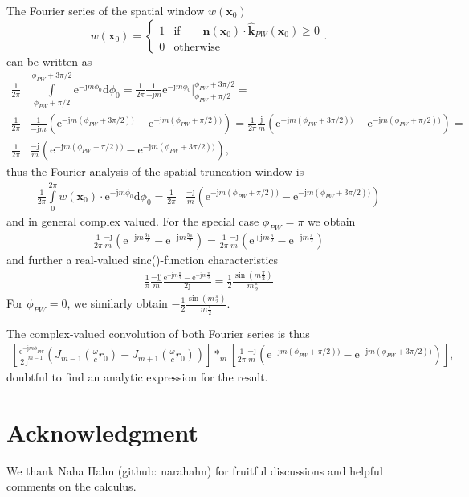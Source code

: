 \documentclass[a4paper,BCOR=15mm,10pt,twoside]{scrartcl}
\newcommand\e{\mathrm{e}}  %
\newcommand\im{\mathrm{j}}  %
\newcommand\fsd{\mathrm{d}}  %
\renewcommand{\vec}[1]{\mathbf{#1}}  %
\newcommand\unitn{\vec{n}}  %
\begin{document}
The Fourier series of the spatial window $w(\vec{x}_0)$
\begin{equation}
w(\vec{x}_0) =
    \begin{cases}
      1 & \text{if}\qquad
       \unitn(\vec{x}_0) \cdot \hat{\vec{k}}_{PW}(\vec{x}_0) \geq 0 \\
      0 & \text{otherwise}
    \end{cases}.
\end{equation}
can be written as
\begin{align}
\frac{1}{2 \pi}& \int\limits_{\phi_{PW}+\pi/2}^{\phi_{PW}+3\pi/2} \e^{- \im m \phi_0 } \fsd \phi_0 =
\frac{1}{2 \pi} \frac{1}{-\im m} \e^{- \im m \phi_0 }\bigg|_{\phi_{PW}+\pi/2}^{\phi_{PW}+3\pi/2} =\\
\frac{1}{2 \pi}& \frac{1}{-\im m} (\e^{- \im m (\phi_{PW}+3\pi/2)) } - \e^{- \im m (\phi_{PW}+\pi/2))})=
\frac{1}{2 \pi} \frac{\im}{m} (\e^{- \im m (\phi_{PW}+3\pi/2)) } - \e^{- \im m (\phi_{PW}+\pi/2))})=\\
\frac{1}{2 \pi}& \frac{-\im}{m} (\e^{- \im m (\phi_{PW}+\pi/2))}-\e^{- \im m (\phi_{PW}+3\pi/2)) }),
\end{align}
thus the Fourier analysis of the spatial truncation window is
\begin{align}
\frac{1}{2 \pi}
\int\limits_0^{2 \pi} w(\vec{x}_0) \cdot \e^{- \im m \phi_0 } \fsd \phi_0 = \frac{1}{2 \pi}& \frac{-\im}{m} (\e^{- \im m (\phi_{PW}+\pi/2))}-\e^{- \im m (\phi_{PW}+3\pi/2)) })
\end{align}
and in general complex valued. For the special case $\phi_{PW} = \pi$ we obtain
\begin{align}
\frac{1}{2 \pi} \frac{-\im}{m} (\e^{- \im m \frac{3 \pi}{2}}-\e^{- \im m \frac{5 \pi}{2} }) =
\frac{1}{2 \pi} \frac{-\im}{m} (\e^{+ \im m \frac{\pi}{2}}-\e^{- \im m \frac{\pi}{2} })
\end{align}
and further a real-valued sinc()-function characteristics
\begin{align}
\frac{1}{\pi} \frac{-\im\im}{m} \frac{\e^{+ \im m \frac{\pi}{2}}-\e^{- \im m \frac{\pi}{2} }}{2 \im} = \frac{1}{2} \frac{\sin(m\frac{\pi}{2})}{m\frac{\pi}{2}}
\end{align}
For $\phi_{PW} = 0$, we similarly obtain $-\frac{1}{2} \frac{\sin(m\frac{\pi}{2})}{m\frac{\pi}{2}}$.

The complex-valued convolution of both Fourier series is thus 
\begin{align}
\left[\frac{\e^{- \im m \phi_{PW}}}{2\,\im^{m-1}}
(J_{m-1}(\frac{\omega}{c} r_0) - J_{m+1}(\frac{\omega}{c} r_0))\right]
*_m
\left[\frac{1}{2 \pi} \frac{-\im}{m} (\e^{- \im m (\phi_{PW}+\pi/2))}-\e^{- \im m (\phi_{PW}+3\pi/2)) })\right],
\end{align}
doubtful to find an analytic expression for the result.


\section{Acknowledgment}
We thank Naha Hahn (github: narahahn) for fruitful discussions and helpful comments on the calculus.



\end{document}
